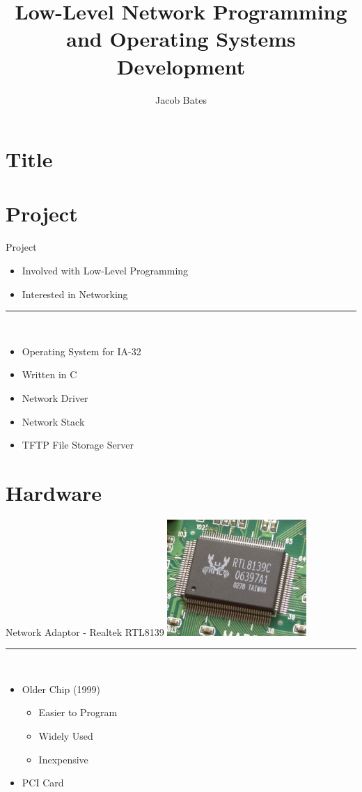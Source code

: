 \documentclass{beamer}
\title{Low-Level Network Programming and Operating Systems Development}
\author{Jacob Bates}
\institute{Da Vinci Science High School}
\begin{document}
\section{Title}

    \begin{frame}
        \titlepage
    \end{frame}

\section{Project}

    \begin{frame}{Project}
        \begin{itemize}
            \item Involved with Low-Level Programming
            \item Interested in Networking
        \end{itemize}
        \rule{0.5\textwidth}{0.5pt} \\
        \begin{itemize}
            \item Operating System for IA-32
            \item Written in C
            \item Network Driver
            \item Network Stack
            \item TFTP File Storage Server
        \end{itemize}
    \end{frame}

\section{Hardware}

    \begin{frame}{Network Adaptor - Realtek RTL8139}
        \includegraphics[height=125pt]{Realtek_RTL8139C.jpg} \\
        \rule{0.5\textwidth}{0.5pt} \\
        \begin{itemize}
            \item Older Chip (1999)
            \begin{itemize}
                \item Easier to Program
                \item Widely Used
                \item Inexpensive
            \end{itemize}
            \item PCI Card
        \end{itemize}
    \end{frame}
\end{document}
